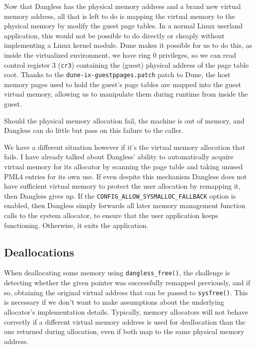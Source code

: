 Now that Dangless has the physical memory address and a brand new virtual memory address, all that is left to do is mapping the virtual memory to the physical memory by modify the guest page tables. In a normal Linux userland application, this would not be possible to do directly or cheaply without implementing a Linux kernel module. Dune makes it possible for us to do this, as inside the virtualized environment, we have ring 0 privileges, so we can read control register 3 (\lstinline!cr3!) containing the (guest) physical address of the page table root. Thanks to the \texttt{dune-ix-guestppages.patch} patch to Dune, the host memory pages used to hold the guest's page tables are mapped into the guest virtual memory, allowing us to manipulate them during runtime from inside the guest.

Should the physical memory allocation fail, the machine is out of memory, and Dangless can do little but pass on this failure to the caller.

We have a different situation however if it's the virtual memory allocation that fails. I have already talked about Dangless' ability to automatically acquire virtual memory for its allocator by scanning the page table and taking unused PML4 entries for its own use. If even despite this mechanism Dangless does not have sufficient virtual memory to protect the user allocation by remapping it, then Dangless gives up. If the \lstinline!CONFIG_ALLOW_SYSMALLOC_FALLBACK! option is enabled, then Dangless simply forwards all later memory management function calls to the system allocator, to ensure that the user application keeps functioning. Otherwise, it exits the application.

\subsection{Deallocations}
\label{ssec:deallocations}

When deallocating some memory using \lstinline!dangless_free()!, the challenge is detecting whether the given pointer was successfully remapped previously, and if so, obtaining the original virtual address that can be passed to \lstinline!sysfree()!.
This is necessary if we don't want to make assumptions about the underlying allocator's implementation details. Typically, memory allocators will not behave correctly if a different virtual memory address is used for deallocation than the one returned during allocation, even if both map to the same physical memory address.

